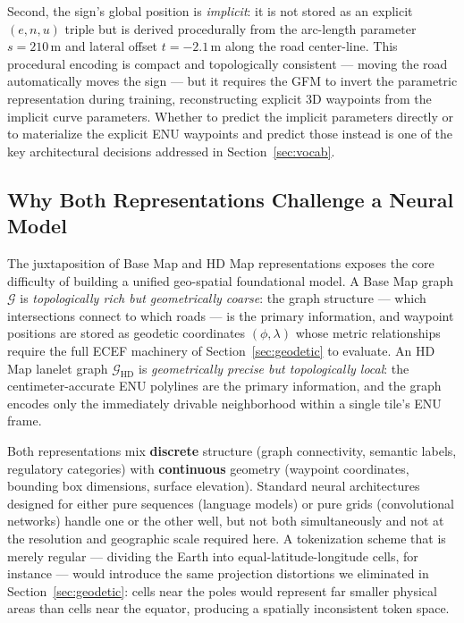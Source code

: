 \documentclass{book}
\begin{document}
Second, the sign's global position is \emph{implicit}: it is not
stored as an explicit $(e, n, u)$ triple but is derived procedurally
from the arc-length parameter $s = 210$\,m and lateral offset
$t = -2.1$\,m along the road center-line.  This procedural encoding
is compact and topologically consistent --- moving the road
automatically moves the sign --- but it requires the GFM to invert
the parametric representation during training, reconstructing explicit
3D waypoints from the implicit curve parameters.  Whether to predict
the implicit parameters directly or to materialize the explicit ENU
waypoints and predict those instead is one of the key architectural
decisions addressed in Section~\ref{sec:vocab}.

\subsection{Why Both Representations Challenge a Neural Model}

The juxtaposition of Base Map and HD Map representations exposes the
core difficulty of building a unified geo-spatial foundational model.
A Base Map graph $\mathcal{G}$ is \emph{topologically rich but
geometrically coarse}: the graph structure --- which intersections
connect to which roads --- is the primary information, and waypoint
positions are stored as geodetic coordinates $(\phi, \lambda)$ whose
metric relationships require the full ECEF machinery of
Section~\ref{sec:geodetic} to evaluate.  An HD Map lanelet graph
$\mathcal{G}_{\text{HD}}$ is \emph{geometrically precise but
topologically local}: the centimeter-accurate ENU polylines are the
primary information, and the graph encodes only the immediately
drivable neighborhood within a single tile's ENU frame.

Both representations mix \textbf{discrete} structure (graph
connectivity, semantic labels, regulatory categories) with
\textbf{continuous} geometry (waypoint coordinates, bounding box
dimensions, surface elevation).  Standard neural architectures
designed for either pure sequences (language models) or pure grids
(convolutional networks) handle one or the other well, but not both
simultaneously and not at the resolution and geographic scale required
here.  A tokenization scheme that is merely regular --- dividing the
Earth into equal-latitude-longitude cells, for instance --- would
introduce the same projection distortions we eliminated in
Section~\ref{sec:geodetic}: cells near the poles would represent
far smaller physical areas than cells near the equator, producing a
spatially inconsistent token space.
\end{document}
